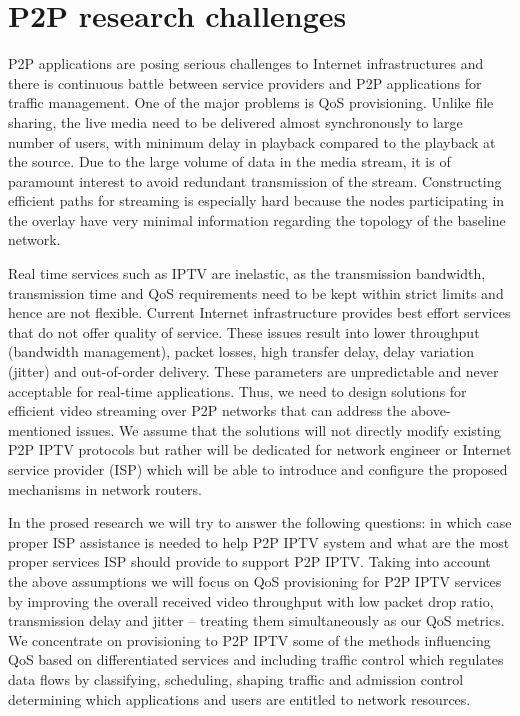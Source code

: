\documentclass[10pt, conference, compsocconf]{IEEEtran}
\begin{document}
\section{P2P research challenges}
P2P applications are posing serious challenges to Internet infrastructures and there is continuous battle between service providers and P2P applications for traffic management. One of the major problems is QoS provisioning. Unlike file sharing, the live media need to be delivered almost synchronously to large number of users, with minimum delay in playback compared to the playback at the source. Due to the large volume of data in the media stream, it is of paramount interest to avoid redundant transmission of the stream. Constructing efficient paths for streaming is especially hard because the nodes participating in the overlay have very minimal information regarding the topology of the baseline network.

Real time services such as IPTV are inelastic, as the transmission bandwidth, transmission time and QoS requirements need to be kept within strict limits and hence are not flexible. Current Internet infrastructure provides best effort services that do not offer quality of service. These issues result into lower throughput (bandwidth management), packet losses, high transfer delay, delay variation (jitter) and out-of-order delivery. These parameters are unpredictable and never acceptable for real-time applications. Thus, we need to design solutions for efficient video streaming over P2P networks that can address the above-mentioned issues. We assume that the solutions will not directly modify existing P2P IPTV protocols but rather will be dedicated for network engineer or Internet service provider (ISP) which will be able to introduce and configure the proposed mechanisms in network routers.
 
In the prosed research we will try to answer the following questions: in which case proper ISP assistance is needed to help P2P IPTV system and what are the most proper services ISP should provide to support P2P IPTV. Taking into account the above assumptions we will focus on QoS provisioning for P2P IPTV services by improving the overall received video throughput with low packet drop ratio, transmission delay and jitter -- treating them simultaneously as our QoS metrics. We concentrate on provisioning to P2P IPTV some of the methods influencing QoS based on differentiated services and including traffic control which regulates data flows by classifying, scheduling, shaping traffic and admission control determining which applications and users are entitled to network resources. 
\end{document}
